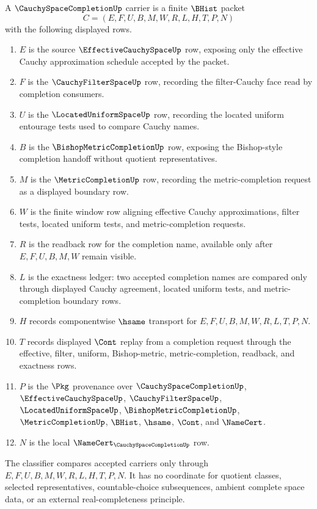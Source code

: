\begin{definition}
\label{def:cauchy-space-completion-carrier}
A $\CauchySpaceCompletionUp$ carrier is a finite $\BHist$ packet
$$
C=(E,F,U,B,M,W,R,L,H,T,P,N)
$$
with the following displayed rows.
\begin{enumerate}
\item $E$ is the source $\EffectiveCauchySpaceUp$ row, exposing only the effective Cauchy approximation schedule accepted by the packet.
\item $F$ is the $\CauchyFilterSpaceUp$ row, recording the filter-Cauchy face read by completion consumers.
\item $U$ is the $\LocatedUniformSpaceUp$ row, recording the located uniform entourage tests used to compare Cauchy names.
\item $B$ is the $\BishopMetricCompletionUp$ row, exposing the Bishop-style completion handoff without quotient representatives.
\item $M$ is the $\MetricCompletionUp$ row, recording the metric-completion request as a displayed boundary row.
\item $W$ is the finite window row aligning effective Cauchy approximations, filter tests, located uniform tests, and metric-completion requests.
\item $R$ is the readback row for the completion name, available only after $E,F,U,B,M,W$ remain visible.
\item $L$ is the exactness ledger: two accepted completion names are compared only through displayed Cauchy agreement, located uniform tests, and metric-completion boundary rows.
\item $H$ records componentwise $\hsame$ transport for $E,F,U,B,M,W,R,L,T,P,N$.
\item $T$ records displayed $\Cont$ replay from a completion request through the effective, filter, uniform, Bishop-metric, metric-completion, readback, and exactness rows.
\item $P$ is the $\Pkg$ provenance over $\CauchySpaceCompletionUp$, $\EffectiveCauchySpaceUp$, $\CauchyFilterSpaceUp$, $\LocatedUniformSpaceUp$, $\BishopMetricCompletionUp$, $\MetricCompletionUp$, $\BHist$, $\hsame$, $\Cont$, and $\NameCert$.
\item $N$ is the local $\NameCert_{\CauchySpaceCompletionUp}$ row.
\end{enumerate}
The classifier compares accepted carriers only through $E,F,U,B,M,W,R,L,H,T,P,N$. It has no coordinate for quotient classes, selected representatives, countable-choice subsequences, ambient complete space data, or an external real-completeness principle.
\end{definition}

